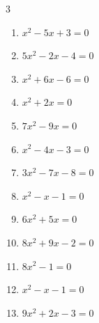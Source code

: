 \begin{multicols}{3}
\begin{enumerate}
  \item $x^{2}-5x+3=0$


  \item $5x^{2}-2x-4=0$


  \item $x^{2}+6x-6=0$


\columnbreak %

  \item $x^{2}+2x=0$

        \phantom{$\displaystyle x=0, \; -2$}

  \item $7x^{2}-9x=0$


  \item $x^{2}-4x-3=0$


  \item $3x^{2}-7x-8=0$


  \item $x^{2}-x-1=0$


  \item $6x^{2}+5x=0$


  \item $8x^{2}+9x-2=0$


\columnbreak %

\resetques

  \item $8x^{2}-1=0$


  \item $x^{2}-x-1=0$


  \item $9x^{2}+2x-3=0$


\end{enumerate}
\end{multicols}
